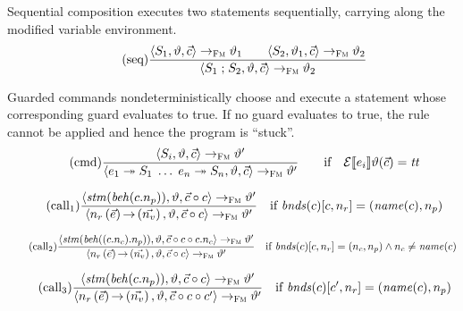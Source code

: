 \documentclass[a4paper,10pt,english]{article}
\begin{document}
Sequential composition executes two statements sequentially, carrying along the modified variable environment.
\begin{equation*}
	\tag{seq}
	\dfrac
	{
		\langle S_1, \vartheta, \vec{c} \rangle
			\rightarrow_{\textsc{Fm}}
		\vartheta_1
		\qquad
		\langle S_2, \vartheta_1, \vec{c} \rangle
			\rightarrow_{\textsc{Fm}}
		\vartheta_2
	}
	{
		\langle S_1 \; \mathtt{;} \; S_2, \vartheta, \vec{c} \rangle
			\rightarrow_{\textsc{Fm}}
		\vartheta_2
	}
\end{equation*}

Guarded commands nondeterministically choose and execute a statement whose corresponding guard evaluates to true. If no guard
evaluates to true, the rule cannot be applied and hence the program is ``stuck''.
\begin{equation*}
	\tag{cmd}
	\dfrac
	{
		\langle S_i, \vartheta, \vec{c} \rangle
			\rightarrow_{\textsc{Fm}}
		\vartheta'
	}
	{
		\langle e_1 \; \mathtt{\twoheadrightarrow} \; S_1 \; \ldots \; e_n \; \mathtt{\twoheadrightarrow} \; S_n, \vartheta,
		\vec{c} \rangle
			\rightarrow_{\textsc{Fm}}
		\vartheta'
	}
	\qquad \text{if} \quad \mathcal{E} \llbracket e_i \rrbracket \vartheta(\vec{c}) = \mathit{tt}
\end{equation*}

\begin{equation*}
	\tag{call${}_1$}
	\dfrac
	{
		\configuration{\stmof(\behavior(\comp.\provPortName)), \varEnvFmScoped, \toList{\comp} \cons \comp}
			\stmArrowFm
		\varEnvFmScoped'
	}
	{
		\configuration{\invoke{\reqPortName}{\toList{\expr}}{\toList{\varName}}, \varEnvFmScoped, \toList{\comp} \cons \comp}
			\stmArrowFm
		\varEnvFmScoped'
	}
	\quad \text{if } \bindings(\comp)[\comp, \reqPortName] = (\nameof(\comp), \provPortName)
\end{equation*}

\begin{equation*}
	\tag{call${}_2$}
	\dfrac
	{
		\configuration{\stmof(\behavior((\comp.\compName).\provPortName)), \varEnvFmScoped, \toList{\comp} \cons \comp \cons
		\comp.\compName}
			\stmArrowFm
		\varEnvFmScoped'
	}
	{
		\configuration{\invoke{\reqPortName}{\toList{\expr}}{\toList{\varName}}, \varEnvFmScoped, \toList{\comp} \cons \comp}
			\stmArrowFm
		\varEnvFmScoped'
	}
	\quad \text{if } \bindings(\comp)[\comp, \reqPortName] = (\compName, \provPortName) \wedge \compName \neq \nameof(\comp)
\end{equation*}

\begin{equation*}
	\tag{call${}_3$}
	\dfrac
	{
		\configuration{\stmof(\behavior(\comp.\provPortName)), \varEnvFmScoped, \toList{\comp} \cons \comp}
			\stmArrowFm
		\varEnvFmScoped'
	}
	{
		\configuration{\invoke{\reqPortName}{\toList{\expr}}{\toList{\varName}}, \varEnvFmScoped, \toList{\comp} \cons \comp \cons
		\comp'}
			\stmArrowFm
		\varEnvFmScoped'
	}
	\quad \text{if } \bindings(\comp)[\comp', \reqPortName] = (\nameof(\comp), \provPortName)
\end{equation*}
\end{document}
